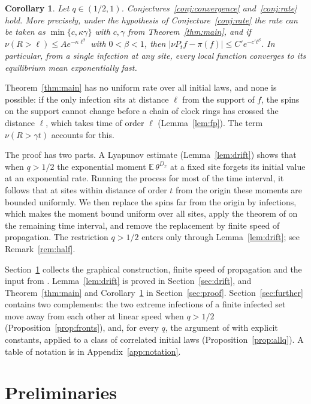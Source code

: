 \documentclass[11pt]{amsart}
\newtheorem{corollary}[theorem]{Corollary}
\theoremstyle{remark}
\newcommand{\E}{\mathbb{E}}
\begin{document}
\begin{corollary}\label{cor:conjectures}
Let $q\in(1/2,1)$. Conjectures~\ref{conj:convergence} and~\ref{conj:rate} hold. More precisely, under the
hypothesis of Conjecture~\ref{conj:rate} the rate can be taken as $\min\{c,\kappa\gamma\}$ with $c,\gamma$ from
Theorem~\ref{thm:main}, and if $\nu(R>\ell)\le Ae^{-\kappa\ell^\beta}$ with $0<\beta<1$, then
$|\nu P_tf-\pi(f)|\le C'e^{-c't^\beta}$. In particular, from a single infection at any site, every local function
converges to its equilibrium mean exponentially fast.
\end{corollary}

Theorem~\ref{thm:main} has no uniform rate over all initial laws, and none is possible: if the only infection sits
at distance $\ell$ from the support of $f$, the spins on the support cannot change before a chain of clock rings has
crossed the distance $\ell$, which takes time of order $\ell$ (Lemma~\ref{lem:fp}). The term $\nu(R>\gamma t)$
accounts for this.

The proof has two parts. A Lyapunov estimate (Lemma~\ref{lem:drift}) shows that when $q>1/2$ the exponential moment
$\E\,\theta^{D_x}$ at a fixed site forgets its initial value at an exponential rate. Running the process for most of
the time interval, it follows that at sites within distance of order $t$ from the origin these moments are bounded
uniformly. We then replace the spins far from the origin by infections, which makes the moment bound uniform over
all sites, apply the theorem of \cite{BCMRT13} on the remaining time interval, and remove the replacement by finite
speed of propagation. The restriction $q>1/2$ enters only through Lemma~\ref{lem:drift}; see
Remark~\ref{rem:half}.

Section~\ref{sec:prelim} collects the graphical construction, finite speed of propagation and the input from
\cite{BCMRT13}. Lemma~\ref{lem:drift} is proved in Section~\ref{sec:drift}, and Theorem~\ref{thm:main} and
Corollary~\ref{cor:conjectures} in Section~\ref{sec:proof}. Section~\ref{sec:further} contains two complements: the
two extreme infections of a finite infected set move away from each other at linear speed when $q>1/2$
(Proposition~\ref{prop:fronts}), and, for every $q$, the argument of \cite{CMST10} with explicit constants, applied
to a class of correlated initial laws (Proposition~\ref{prop:allq}). A table of notation is in
Appendix~\ref{app:notation}.

\section{Preliminaries}\label{sec:prelim}
\end{document}
